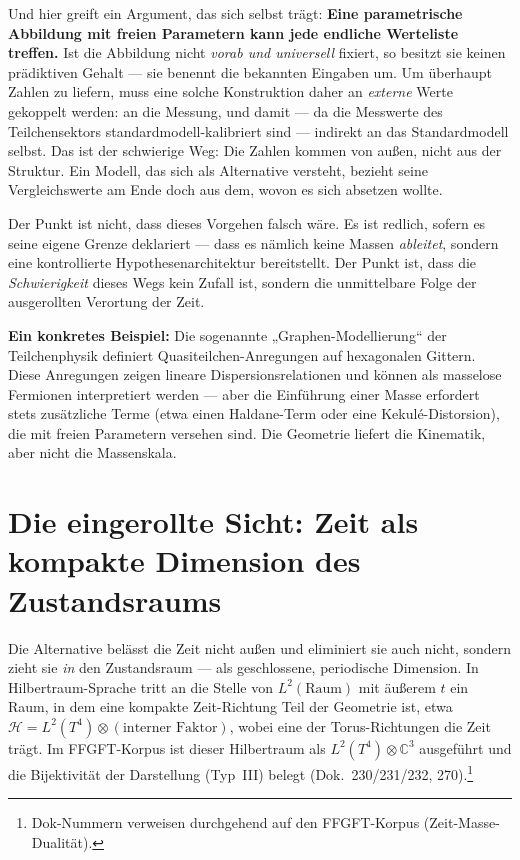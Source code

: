 Und hier greift ein Argument, das sich selbst trägt: \textbf{Eine parametrische Abbildung mit freien Parametern kann jede endliche Werteliste treffen.} Ist die Abbildung nicht \emph{vorab und universell} fixiert, so besitzt sie keinen prädiktiven Gehalt --- sie benennt die bekannten Eingaben um. Um überhaupt Zahlen zu liefern, muss eine solche Konstruktion daher an \emph{externe} Werte gekoppelt werden: an die Messung, und damit --- da die Messwerte des Teilchensektors standardmodell-kalibriert sind --- indirekt an das Standardmodell selbst. Das ist der schwierige Weg: Die Zahlen kommen von außen, nicht aus der Struktur. Ein Modell, das sich als Alternative versteht, bezieht seine Vergleichswerte am Ende doch aus dem, wovon es sich absetzen wollte.

Der Punkt ist nicht, dass dieses Vorgehen falsch wäre. Es ist redlich, sofern es seine eigene Grenze deklariert --- dass es nämlich keine Massen \emph{ableitet}, sondern eine kontrollierte Hypothesenarchitektur bereitstellt. Der Punkt ist, dass die \emph{Schwierigkeit} dieses Wegs kein Zufall ist, sondern die unmittelbare Folge der ausgerollten Verortung der Zeit.

\textbf{Ein konkretes Beispiel:} Die sogenannte „Graphen-Modellierung`` der Teilchenphysik definiert Quasiteilchen-Anregungen auf hexagonalen Gittern. Diese Anregungen zeigen lineare Dispersionsrelationen und können als masselose Fermionen interpretiert werden --- aber die Einführung einer Masse erfordert stets zusätzliche Terme (etwa einen Haldane-Term oder eine Kekulé-Distorsion), die mit freien Parametern versehen sind. Die Geometrie liefert die Kinematik, aber nicht die Massenskala.

\section{Die eingerollte Sicht: Zeit als kompakte Dimension des Zustandsraums}

Die Alternative belässt die Zeit nicht außen und eliminiert sie auch nicht, sondern zieht sie \emph{in} den Zustandsraum --- als geschlossene, periodische Dimension. In Hilbertraum-Sprache tritt an die Stelle von $L^2(\text{Raum})$ mit äußerem $t$ ein Raum, in dem eine kompakte Zeit-Richtung Teil der Geometrie ist, etwa $\mathcal{H} = L^2(T^4)\otimes(\text{interner Faktor})$, wobei eine der Torus-Richtungen die Zeit trägt. Im FFGFT-Korpus ist dieser Hilbertraum als $L^2(T^4)\otimes\mathbb{C}^3$ ausgeführt und die Bijektivität der Darstellung (Typ~III) belegt (Dok.~230/231/232, 270).\footnote{Dok-Nummern verweisen durchgehend auf den FFGFT-Korpus (Zeit-Masse-Dualit\"at).}

